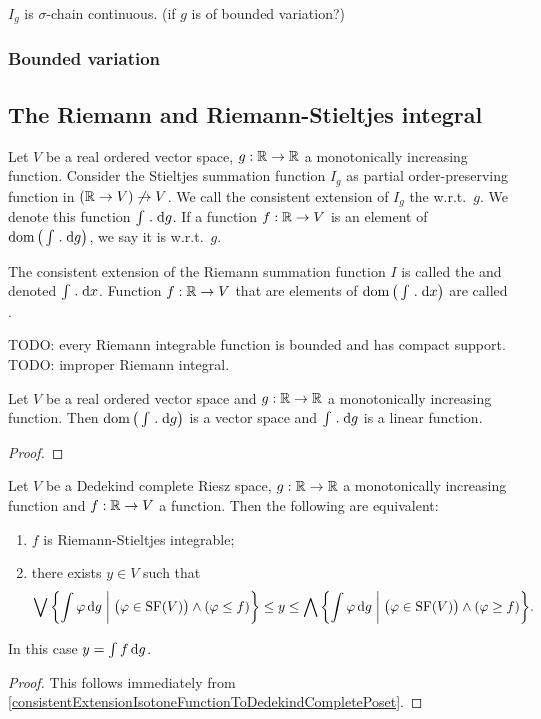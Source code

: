\begin{proposition}
$I_g$ is $\sigma$-chain continuous. (if $g$ is of bounded variation?)
\end{proposition}


\subsubsection{Bounded variation}


\subsection{The Riemann and Riemann-Stieltjes integral}
\begin{definition}
Let $V$ be a real ordered vector space, $g: \mathbb{R}\to\mathbb{R}$ a monotonically increasing function. Consider the Stieltjes summation function $I_g$ as partial order-preserving function in $(\mathbb{R}\to V)\not\to V$. We call the consistent extension of $I_g$ the  w.r.t.\ $g$. We denote this function $\int \mathrel{.} \operatorname{d \!}{g}$.
If a function $f: \mathbb{R} \to V$ is an element of $\operatorname{dom}\big(\int \mathrel{.} \operatorname{d \!}{g}\big)$, we say it is  w.r.t.\ $g$.

The consistent extension of the Riemann summation function $I$ is called the  and denoted $\int \mathrel{.} \operatorname{d \!}{x}$. Function $f: \mathbb{R} \to V$ that are elements of $\operatorname{dom}\big(\int \mathrel{.} \operatorname{d \!}{x}\big)$ are called .
\end{definition}

TODO: every Riemann integrable function is bounded and has compact support. TODO: improper Riemann integral.

\begin{proposition}
Let $V$ be a real ordered vector space and $g: \mathbb{R}\to\mathbb{R}$ a monotonically increasing function. Then $\operatorname{dom}\big(\int \mathrel{.} \operatorname{d \!}{g}\big)$ is a vector space and $\int \mathrel{.} \operatorname{d \!}{g}$ is a linear function.
\end{proposition}
\begin{proof}

\end{proof}

\begin{proposition} \label{RiemannIntegralSqueeze}
Let $V$ be a Dedekind complete Riesz space, $g: \mathbb{R}\to\mathbb{R}$ a monotonically increasing function and $f: \mathbb{R}\to V$ a function. Then the following are equivalent:
\begin{enumerate}
\item $f$ is Riemann-Stieltjes integrable;
\item there exists $y\in V$ such that
\[ \bigvee \setbuilder{\int \varphi \diff{g}}{\big(\varphi \in \SF(V)\big) \land (\varphi \leq f)} \leq y \leq \bigwedge\setbuilder{\int \varphi \diff{g}}{\big(\varphi \in \SF(V)\big) \land (\varphi \geq f)}. \]
\end{enumerate}
In this case $y = \int f \operatorname{d \!}{g}$.
\end{proposition}
\begin{proof}
This follows immediately from \ref{consistentExtensionIsotoneFunctionToDedekindCompletePoset}.
\end{proof}


